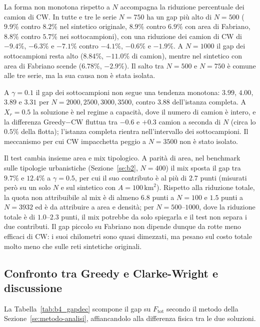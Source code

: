 La forma non monotona rispetto a $N$ accompagna la riduzione percentuale dei camion di CW. In tutte e tre le serie $N=750$ ha un gap più alto di $N=500$ ($9.9\%$ contro $8.2\%$ nel sintetico originale, $8.9\%$ contro $6.9\%$ con area di Fabriano, $8.8\%$ contro $5.7\%$ nei sottocampioni), con una riduzione dei camion di CW di $-9.4\%$, $-6.3\%$ e $-7.1\%$ contro $-4.1\%$, $-0.6\%$ e $-1.9\%$. A $N=1000$ il gap dei sottocampioni resta alto ($8.84\%$, $-11.0\%$ di camion), mentre nel sintetico con area di Fabriano scende ($6.78\%$, $-2.9\%$). Il salto tra $N=500$ e $N=750$ è comune alle tre serie, ma la sua causa non è stata isolata.

A $\gamma=0.1$ il gap dei sottocampioni non segue una tendenza monotona: $3.99$, $4.00$, $3.89$ e $3.31$ per $N=2000,2500,3000,3500$, contro $3.88$ dell'istanza completa. A $X_r=0.5$ la soluzione è nel regime a capacità, dove il numero di camion è intero, e la differenza Greedy$-$CW fluttua tra $-0.6$ e $+0.3$ camion a seconda di $N$ (circa lo $0.5\%$ della flotta); l'istanza completa rientra nell'intervallo dei sottocampioni. Il meccanismo per cui CW impacchetta peggio a $N=3500$ non è stato isolato.

Il test cambia insieme area e mix tipologico. A parità di area, nel benchmark sulle tipologie urbanistiche (Sezione~\ref{se:b2}, $N=400$) il mix sposta il gap tra $9.7\%$ e $12.4\%$ a $\gamma=0.5$, per cui il suo contributo è al più di $2.7$ punti (misurati però su un solo $N$ e sul sintetico con $A=100\,\mathrm{km}^2$). Rispetto alla riduzione totale, la quota non attribuibile al mix è di almeno $6.8$ punti a $N=100$ e $1.5$ punti a $N=3932$ ed è da attribuire a area e densità; per $N=500$--$1000$, dove la riduzione totale è di $1.0$--$2.3$ punti, il mix potrebbe da solo spiegarla e il test non separa i due contributi. Il gap piccolo su Fabriano non dipende dunque da rotte meno efficaci di CW: i suoi chilometri sono quasi dimezzati, ma pesano sul costo totale molto meno che sulle reti sintetiche originali.

\subsection{Confronto tra Greedy e Clarke-Wright e discussione}

La Tabella~\ref{tab:b4_gapdec} scompone il gap su $F_{\mathrm{tot}}$ secondo il metodo della Sezione~\ref{se:metodo-analisi}, affiancandolo alla differenza fisica tra le due soluzioni.

